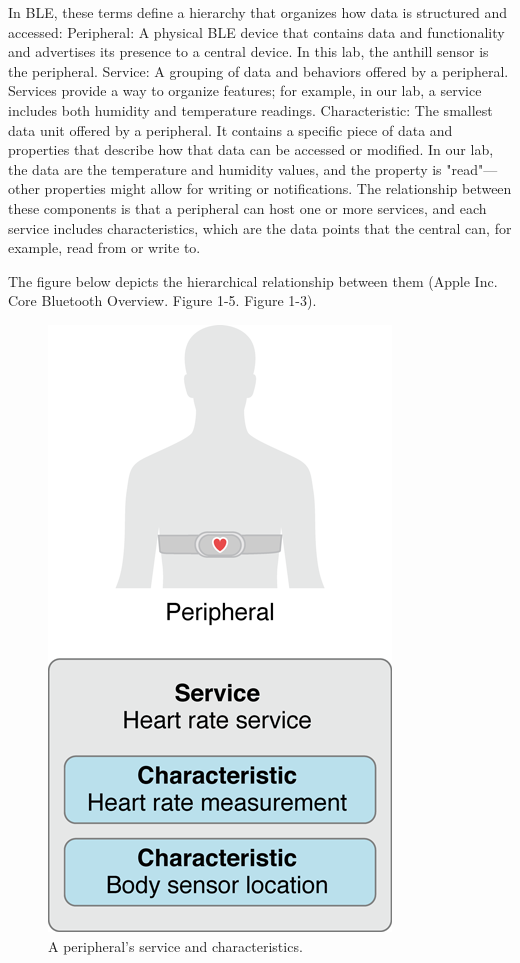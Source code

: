 \documentclass{lab}
\begin{document}
In BLE, these terms define a hierarchy that organizes how data is structured and accessed:
Peripheral: A physical BLE device that contains data and functionality and advertises its presence to a central device. In this lab, the anthill sensor is the peripheral.
Service: A grouping of data and behaviors offered by a peripheral. Services provide a way to organize features; for example, in our lab, a service includes both humidity and temperature readings.
Characteristic: The smallest data unit offered by a peripheral. It contains a specific piece of data and properties that describe how that data can be accessed or modified. In our lab, the data are the temperature and humidity values, and the property is "read"—other properties might allow for writing or notifications.
The relationship between these components is that a peripheral can host one or more services, and each service includes characteristics, which are the data points that the central can, for example, read from or write to.

The figure below depicts the hierarchical relationship between them (Apple Inc. Core Bluetooth Overview. Figure 1-5. Figure 1-3).


\begin{figure}[h]
    \begin{center}
    \includegraphics[height=0.25\textheight]{images/CBPeripheralData.png} 
    \caption{A peripheral’s service and characteristics.}
    \end{center}
\end{figure}
\end{document}
